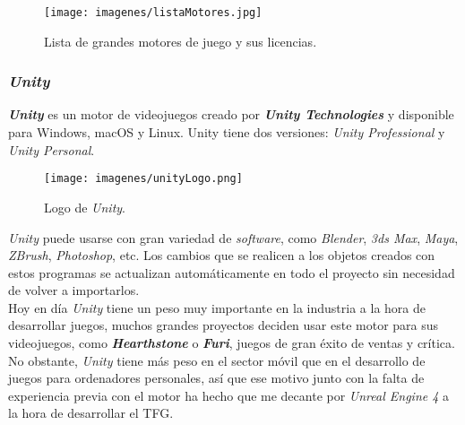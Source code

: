 	\begin{figure}[H]
		
				\vspace{-10pt}
		\begin{center}
			
			\texttt{[image: imagenes/listaMotores.jpg]}
			\caption{Lista de grandes motores de juego y sus licencias.}
		\end{center}
		\vspace{-40pt}
	\end{figure}
	
\subsubsection{\textit{Unity}}

\textbf{\textit{Unity}} es un motor de videojuegos creado por \textit{\textbf{Unity Technologies}} y disponible para Windows, macOS y Linux. Unity tiene dos versiones: \textit{Unity Professional} y \textit{Unity Personal}.
\\

\begin{wrapfigure}{i}{0.5\textwidth}
					\vspace{-10pt}
	\begin{center}
						\vspace{-10pt}
		\texttt{[image: imagenes/unityLogo.png]}
		\caption{Logo de \textit{Unity}.}
						\vspace{-10pt}
	\end{center}
					\vspace{-30pt}
\end{wrapfigure}


\textit{Unity} puede usarse con gran variedad de \textit{software}, como \textit{Blender},\textit{ 3ds Max}, \textit{Maya}, \textit{ZBrush}, \textit{Photoshop}, etc. Los cambios que se realicen a los objetos creados con estos programas se actualizan automáticamente en todo el proyecto sin necesidad de volver a importarlos.
\\


Hoy en día \textit{Unity} tiene un peso muy importante en la industria a la hora de desarrollar juegos, muchos grandes proyectos deciden usar este motor para sus videojuegos, como \textit{\textbf{Hearthstone}} o \textit{\textbf{Furi}}, juegos de gran éxito de ventas y crítica.
\\

No obstante, \textit{Unity} tiene más peso en el sector móvil que en el desarrollo de juegos para ordenadores personales, así que ese motivo junto con la falta de experiencia previa con el motor ha hecho que me decante por \textit{Unreal Engine 4} a la hora de desarrollar el \ac{TFG}.





